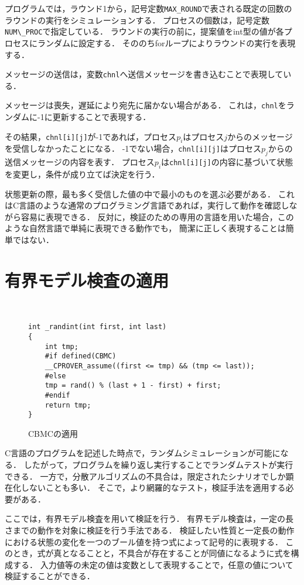 \documentclass[technicalreport]{ieicej}
\theoremstyle{plain}
\begin{document}
プログラムでは，ラウンド1から，記号定数\verb|MAX_ROUND|で表される既定の回数のラウンドの実行をシミュレーションする．
プロセスの個数は，記号定数\verb|NUM\_PROC|で指定している．
ラウンドの実行の前に，提案値をint型の値が各プロセスにランダムに設定する．
そののちforループによりラウンドの実行を表現する．

メッセージの送信は，変数\verb|chnl|へ送信メッセージを書き込むことで表現している．

メッセージは喪失，遅延により宛先に届かない場合がある．
これは，\verb|chnl|をランダムに-1に更新することで表現する．

その結果，\verb|chnl[i][j]|が-1であれば，プロセス$p_i$はプロセス$j$からのメッセージを受信しなかったことになる．
-1でない場合，\verb|chnl[i][j]|はプロセス$p_j$からの送信メッセージの内容を表す．
プロセス$p_i$は\verb|chnl[i][j]|の内容に基づいて状態を変更し，条件が成り立てば決定を行う．

状態更新の際，最も多く受信した値の中で最小のものを選ぶ必要がある．
これはC言語のような通常のプログラミング言語であれば，実行して動作を確認しながら容易に表現できる．
反対に，検証のための専用の言語を用いた場合，このような自然言語で単純に表現できる動作でも，
簡潔に正しく表現することは簡単ではない．

\section{有界モデル検査の適用}\label{sec:cmbc}
\begin{figure}[t]
    \centering　{\scriptsize
\begin{lstlisting}
int _randint(int first, int last)
{
    int tmp;
    #if defined(CBMC)
    __CPROVER_assume((first <= tmp) && (tmp <= last));
    #else
    tmp = rand() % (last + 1 - first) + first;
    #endif
    return tmp;
}
\end{lstlisting}}

        \caption{CBMCの適用}\label{fig:cbmc}
    \end{figure}          
   
C言語のプログラムを記述した時点で，ランダムシミュレーションが可能になる．
したがって，プログラムを繰り返し実行することでランダムテストが実行できる．
一方で，分散アルゴリズムの不具合は，限定されたシナリオでしか顕在化しないことも多い．
そこで，より網羅的なテスト，検証手法を適用する必要がある．

ここでは，有界モデル検査を用いて検証を行う．
有界モデル検査は，一定の長さまでの動作を対象に検証を行う手法である．
検証したい性質と一定長の動作における状態の変化を一つのブール値を持つ式によって記号的に表現する．
このとき，式が真となることと，不具合が存在することが同値になるように式を構成する．
入力値等の未定の値は変数として表現することで，任意の値について検証することができる．
\end{document}
